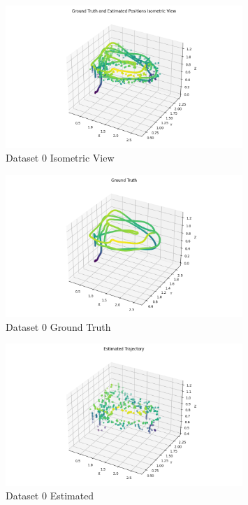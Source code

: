 \documentclass{article}
\begin{document}
\begin{figure}[H]
    \centering
    \includegraphics[width=0.8\textwidth]{./imgs/task1_2/studentdata0_isometric.png}
    \caption{Dataset 0 Isometric View}
\end{figure}

\begin{figure}[H]
    \centering
    \includegraphics[width=0.8\textwidth]{./imgs/task1_2/studentdata0_ground_truth.png}
    \caption{Dataset 0 Ground Truth}
\end{figure}

\begin{figure}[H]
    \centering
    \includegraphics[width=0.8\textwidth]{./imgs/task1_2/studentdata0_estimated.png}
    \caption{Dataset 0 Estimated}
\end{figure}
\end{document}
